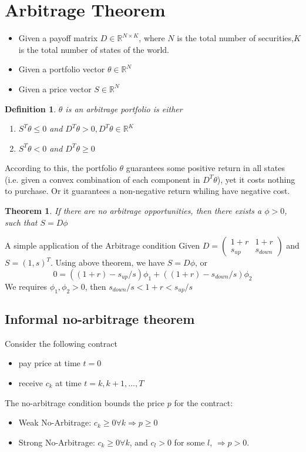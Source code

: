 \documentclass[a4paper,13pt]{report}
\newcommand{\R}{\mathbb{R}}
\newtheorem{theorem}{Theorem}[section]
\newtheorem*{definition}{Definition}
\begin{document}
\section{Arbitrage Theorem}
\begin{itemize}
    \item Given a payoff matrix $D\in \R^{N\times K}$, where $N$ is the total number of securities,$K$ is the total number of states of the world. 
    \item Given a portfolio vector $\theta \in \R^N$
    \item Given a price vector $S\in \R^N$
\end{itemize}
\begin{definition}
$\theta$ is an arbitrage portfolio is either
\begin{enumerate}
    \item $S^T\theta \leq 0$ and $D^T\theta >0, D^T\theta \in \R^K$
    \item $S^T\theta < 0$ and $D^T\theta \geq 0$
\end{enumerate}
\end{definition}

According to this, the portfolio $\theta$ guarantees some positive return in all states (i.e. given a convex combination of each component in $D^T\theta$), yet it costs nothing to purchase. Or it guarantees a non-negative return whiling have negative cost.\cite{hirsa2013introduction}
\begin{theorem}
If there are no arbitrage opportunities, then there exists a $\phi > 0$, such that $S=D\phi$
\end{theorem}

A simple application of the Arbitrage condition
Given 
$D = \begin{pmatrix} 1+r&1+r\\ s_{up} &s_{down} \end{pmatrix}$ and $S = (1,s)^T$. Using above theorem, we have $S=D\phi$, or
$$0 = ((1+r)-s_{up}/s)\phi_1 + ((1+r)-s_{down}/s)\phi_2$$
We requires $\phi_1,\phi_2>0$, then $s_{down}/s < 1+r < s_{up}/s$

\subsection{Informal no-arbitrage theorem}
Consider the following contract
\begin{itemize}
    \item pay price at time $t = 0$
    \item receive $c_k$ at time $t=k,k+1,...,T$
\end{itemize}
The no-arbitrage condition bounds the price $p$ for the contract:
\begin{itemize}
    \item Weak No-Arbitrage: $c_k \geq 0 \forall k \Rightarrow p \geq 0$
    \item Strong No-Arbitrage: $c_k \geq 0 \forall k$, and $c_l >0$ for some $l$, $\Rightarrow p > 0$.
\end{itemize}
\end{document}
